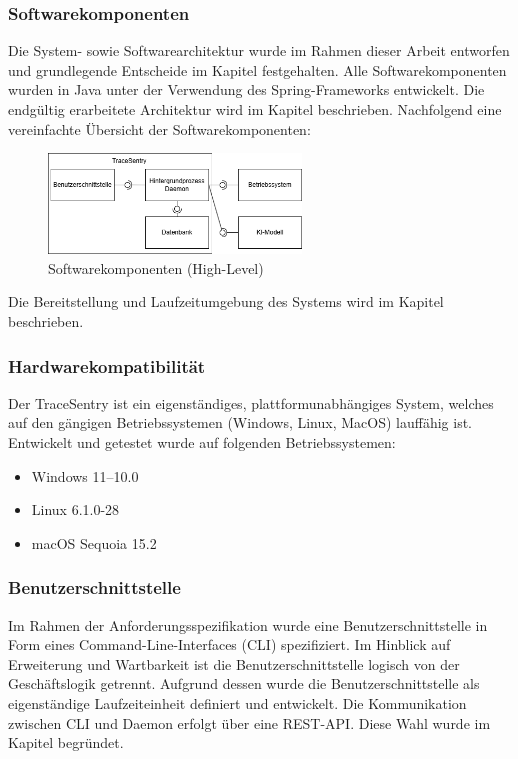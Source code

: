 \documentclass[a4paper,12pt]{report}
\begin{document}
    \subsubsection{Softwarekomponenten}
    Die System- sowie Softwarearchitektur wurde im Rahmen dieser Arbeit entworfen und grundlegende Entscheide im Kapitel  festgehalten.
    Alle Softwarekomponenten wurden in Java unter der Verwendung des Spring-Frameworks entwickelt.
    Die endgültig erarbeitete Architektur wird im Kapitel  beschrieben.
    Nachfolgend eine vereinfachte Übersicht der Softwarekomponenten:

    \begin{figure}[h]
        \centering
        \includegraphics[width=0.6\textwidth]{assets/komponenten-grob}
        \caption{Softwarekomponenten (High-Level)}
        \label{fig:komponenten-grob}
    \end{figure}
    Die Bereitstellung und Laufzeitumgebung des Systems wird im Kapitel  beschrieben.

    \subsubsection{Hardwarekompatibilität}
    Der TraceSentry ist ein eigenständiges, plattformunabhängiges System, welches auf den gängigen Betriebssystemen (Windows, Linux, MacOS) lauffähig ist.
    Entwickelt und getestet wurde auf folgenden Betriebssystemen:
    \begin{itemize}
        \item Windows 11--10.0
        \item Linux 6.1.0-28
        \item macOS Sequoia 15.2
    \end{itemize}

    \subsubsection{Benutzerschnittstelle}
    Im Rahmen der Anforderungsspezifikation wurde eine Benutzerschnittstelle in Form eines Command-Line-Interfaces (CLI) spezifiziert.
    Im Hinblick auf Erweiterung und Wartbarkeit ist die Benutzerschnittstelle logisch von der Geschäftslogik getrennt.
    Aufgrund dessen wurde die Benutzerschnittstelle als eigenständige Laufzeiteinheit definiert und entwickelt.
    Die Kommunikation zwischen CLI und Daemon erfolgt über eine REST-API.
    Diese Wahl wurde im Kapitel  begründet.
\end{document}
